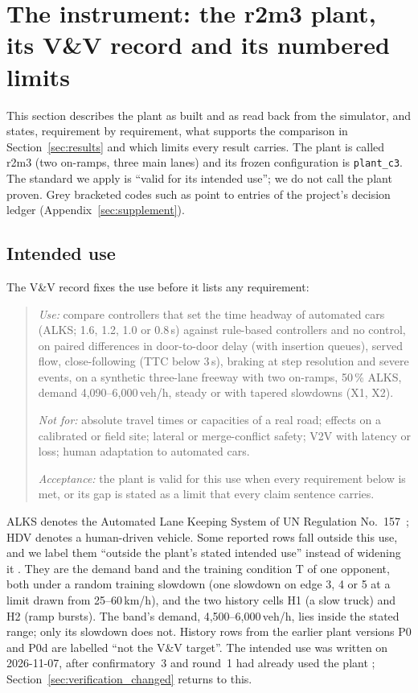 \section{The instrument: the r2m3 plant, its V\&V record and its numbered limits}\label{sec:the_instrument}

This section describes the plant as built and as read back from the simulator, and states, requirement by requirement, what supports the comparison in Section~\ref{sec:results} and which limits every result carries.
The plant is called r2m3 (two on-ramps, three main lanes) and its frozen configuration is \texttt{plant\_c3}.
The standard we apply is ``valid for its intended use''; we do not call the plant proven.
Grey bracketed codes such as  point to entries of the project's decision ledger (Appendix~\ref{sec:supplement}).

\subsection{Intended use}\label{sec:intended_use}

The V\&V record fixes the use before it lists any requirement:

\begin{quote}
\emph{Use:} compare controllers that set the time headway of automated cars (ALKS; 1.6, 1.2, 1.0 or 0.8\,s) against rule-based controllers and no control, on paired differences in door-to-door delay (with insertion queues), served flow, close-following (TTC below 3\,s), braking at step resolution and severe events, on a synthetic three-lane freeway with two on-ramps, 50\,\% ALKS, demand 4,090--6,000\,veh/h, steady or with tapered slowdowns (X1, X2).

\emph{Not for:} absolute travel times or capacities of a real road; effects on a calibrated or field site; lateral or merge-conflict safety; V2V with latency or loss; human adaptation to automated cars.

\emph{Acceptance:} the plant is valid for this use when every requirement below is met, or its gap is stated as a limit that every claim sentence carries.
\end{quote}

ALKS denotes the Automated Lane Keeping System of UN Regulation No.~157~\autocite{UNR157}\verify; HDV denotes a human-driven vehicle.
Some reported rows fall outside this use, and we label them ``outside the plant's stated intended use'' instead of widening it .
They are the demand band and the training condition T of one opponent, both under a random training slowdown (one slowdown on edge 3, 4 or 5 at a limit drawn from 25--60\,km/h), and the two history cells H1 (a slow truck) and H2 (ramp bursts).
The band's demand, 4,500--6,000\,veh/h, lies inside the stated range; only its slowdown does not.
History rows from the earlier plant versions P0 and P0d are labelled ``not the V\&V target''.
The intended use was written on 2026-11-07, after confirmatory~3 and round~1 had already used the plant ; Section~\ref{sec:verification_changed} returns to this.

